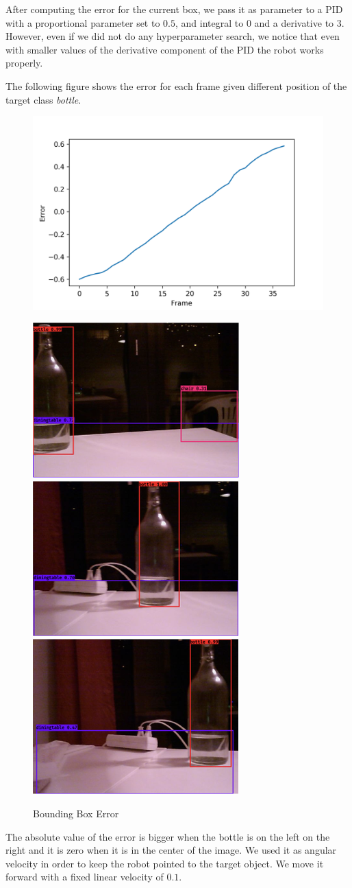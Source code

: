 \documentclass[letterpaper, 10 pt, conference]{ieeeconf}  %
\begin{document}
After computing the error for the current box, we pass it as parameter to a PID with a proportional parameter set to $0.5$, and integral to $0$ and a derivative to $3$. However, even if we did not do any hyperparameter search, we notice that even with smaller values of the derivative component of the PID the robot works properly. 

The following figure shows the error for each frame given different position of the target class \emph{bottle}.
\begin{figure}[H]
\begin{center}
	\includegraphics[width=\linewidth]{images/frame_error.png}
\end{center}	
\begin{center}
\includegraphics[width=0.31\linewidth]{images/bottle/1}	
\includegraphics[width=0.31\linewidth]{images/bottle/2}	
\includegraphics[width=0.31\linewidth]{images/bottle/3}		
\end{center}
\caption{Bounding Box Error}
\end{figure}
The absolute value of the error is bigger when the bottle is on the left on the right and it is zero when it is in the center of the image. We used it as angular velocity in order to keep the robot pointed to the target object. We move it forward with a fixed linear velocity of $0.1$.
\end{document}
